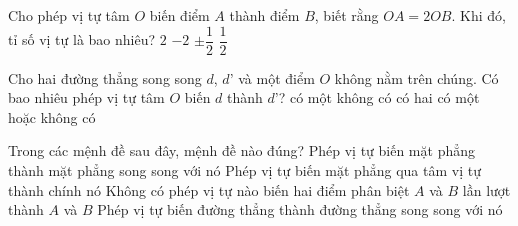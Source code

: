 \begin{ex}%
	Cho phép vị tự tâm $O$ biến điểm $A$ thành điểm $B$, biết rằng $OA=2OB$. Khi đó, tỉ số vị tự là bao nhiêu?
	\choice
	{$2$}
	{$-2$}
	{\True $\pm\dfrac{1}{2}$}
	{$\dfrac{1}{2}$}
\end{ex}
\begin{ex}%
	Cho hai đường thẳng song song $d$, $d’$ và một điểm $O$ không nằm trên chúng. Có bao nhiêu phép vị tự tâm $O$ biến $d$ thành $d’$?
	\choice
	{có một}
	{không có}
	{có hai}
	{\True có một hoặc không có}
\end{ex}
\begin{ex}%
	Trong các mệnh đề sau đây, mệnh đề nào đúng?
	\choice
	{Phép vị tự biến mặt phẳng thành mặt phẳng song song với nó}
	{\True Phép vị tự biến mặt phẳng qua tâm vị tự thành chính nó}
	{Không có phép vị tự nào biến hai điểm phân biệt $A$ và $B$ lần lượt thành $A$ và $B$}
	{Phép vị tự biến đường thẳng thành đường thẳng song song với nó}
\end{ex}
